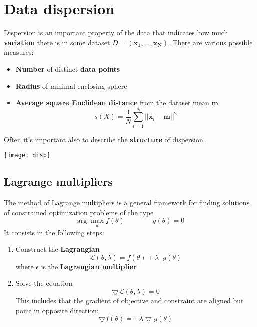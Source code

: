 \newpage
\section{Data dispersion}
Dispersion is an important property of the data that indicates how much \textbf{variation} there is in some dataset $D=(\mathbf{x_1, \ldots, \mathbf{x}_N})$. There are various possible measures:
\begin{itemize}
	\item \textbf{Number} of distinct \textbf{data points}
	\item \textbf{Radius} of minimal enclosing sphere
	\item \textbf{Average square Euclidean distance} from the dataset mean $\mathbf{m}$
	\begin{equation}
		s(X)=\frac{1}{N} \sum_{i=1}^{N}\lvert\lvert \mathbf{x}_i - \mathbf{m}\rvert\rvert^2
	\end{equation}
\end{itemize}
Often it's important also to describe the \textbf{structure} of dispersion.
\begin{center}
	\texttt{[image: disp]}
\end{center}

\subsection{Lagrange multipliers}
The method of Lagrange multipliers is a general framework for finding solutions of constrained optimization problems of the type
\begin{equation*}
	\arg\max_\theta f(\theta) \qquad\qquad g(\theta)=0
\end{equation*}
It consists in the following steps:
\begin{enumerate}
	\item Construct the \textbf{Lagrangian}
	\begin{equation}
		\mathcal{L}(\theta, \lambda) = f(\theta) + \lambda \cdot g(\theta)
	\end{equation}
	where $\epsilon$ is the \textbf{Lagrangian multiplier}
	\item Solve the equation
	\begin{equation}
		\bigtriangledown\mathcal{L}(\theta, \lambda)=0
	\end{equation}
	This includes that the gradient of objective and constraint are aligned but point in opposite direction:
	\begin{equation}
		\bigtriangledown f(\theta) = -\lambda\bigtriangledown g(\theta)
	\end{equation}
\end{enumerate}

